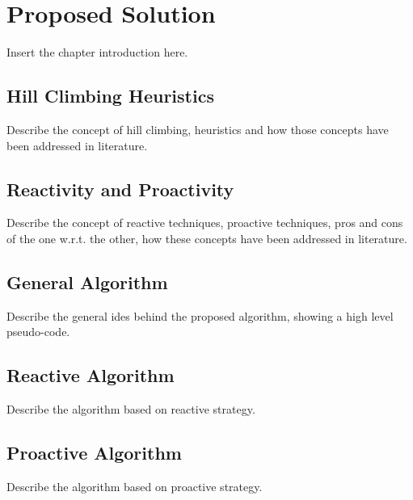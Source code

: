 \chapter{Proposed Solution}
\label{chp:proposed-solution}


Insert the chapter introduction here.


\section{Hill Climbing Heuristics}
\label{sec:hill-climbing-heuristics}
Describe the concept of hill climbing, heuristics and how those concepts have been addressed in literature.


\section{Reactivity and Proactivity}
\label{sec:reactivity-and-proactivity}
Describe the concept of reactive techniques, proactive techniques, pros and cons of the one w.r.t. the other, how these concepts have been addressed in literature.


\section{General Algorithm}
\label{sec:general-algorithm}
Describe the general ides behind the proposed algorithm, showing a high level pseudo-code.


\section{Reactive Algorithm}
\label{sec:reactive-algorithm}
Describe the algorithm based on reactive strategy.


\section{Proactive Algorithm}
\label{sec:proactive-algorithm}
Describe the algorithm based on proactive strategy.
